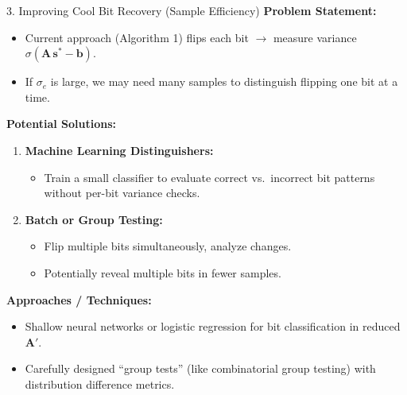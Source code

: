 \documentclass{beamer}
\begin{document}
\begin{frame}{3. Improving Cool Bit Recovery (Sample Efficiency)}
  \textbf{Problem Statement:}
  \begin{itemize}
    \item Current approach (Algorithm 1) flips each bit $\rightarrow$ measure variance 
      $\sigma(\mathbf{A}\,\mathbf{s}^* - \mathbf{b})$.
    \item If $\sigma_e$ is large, we may need many samples to distinguish flipping one bit at a time.
  \end{itemize}

  \textbf{Potential Solutions:}
  \begin{enumerate}
    \item \textbf{Machine Learning Distinguishers:}
      \begin{itemize}
        \item Train a small classifier to evaluate correct vs.\ incorrect bit patterns 
              without per-bit variance checks.
      \end{itemize}
    \item \textbf{Batch or Group Testing:}
      \begin{itemize}
        \item Flip multiple bits simultaneously, analyze changes. 
        \item Potentially reveal multiple bits in fewer samples.
      \end{itemize}
  \end{enumerate}
  
  \textbf{Approaches / Techniques:}
  \begin{itemize}
    \item Shallow neural networks or logistic regression for bit classification in reduced $\mathbf{A}'$.
    \item Carefully designed “group tests” (like combinatorial group testing) 
      with distribution difference metrics.
  \end{itemize}
\end{frame}
\end{document}
